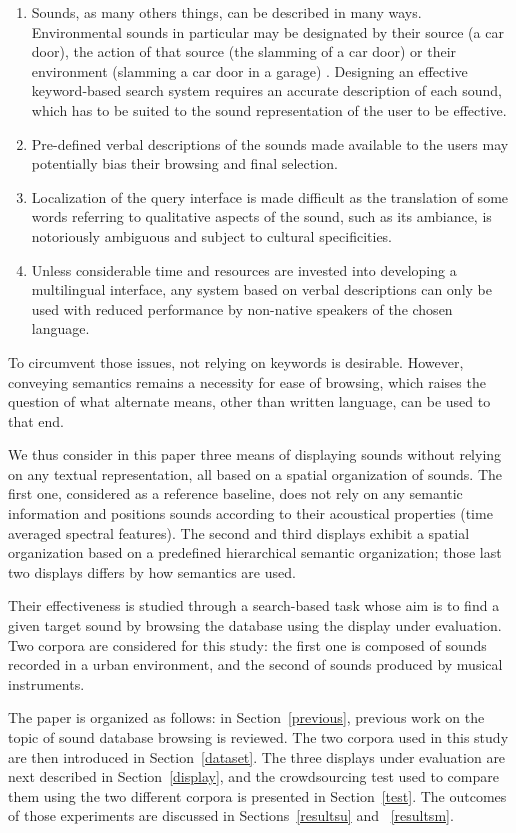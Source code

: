 \documentclass{aes2e}
\begin{document}
\begin{enumerate}
\item Sounds, as many others things, can be described in many ways. Environmental sounds in particular may be designated by their
source (a car door),  the action of that source (the slamming of a car door) or their environment (slamming a car door in a garage) \cite{houix2012lexical, niessen2010categories, brown2011towards}. Designing an effective keyword-based search system requires an accurate description of each sound, which has to be suited to the sound representation of the user to be effective.
\item Pre-defined verbal descriptions of the sounds made available to the users may potentially bias their browsing and final selection.
\item Localization of the query interface is made difficult as the translation of some words referring to qualitative aspects of the sound, such as its ambiance, is notoriously ambiguous and subject to cultural specificities.
\item Unless considerable time and resources are invested into developing a multilingual interface, any system based on verbal descriptions can only be used with reduced performance by non-native speakers of the chosen language.
\end{enumerate}
To circumvent those issues, not relying on keywords is desirable. However, conveying semantics remains a necessity for ease of browsing, which raises the question of what alternate means, other than written language, can be used to that end.

We thus consider in this paper three means of displaying sounds without relying on any textual representation, all based on a spatial organization of sounds. The first one, considered as a reference baseline, does not rely on any semantic information and positions sounds according to their acoustical properties (time averaged spectral features). The second and third displays exhibit a spatial organization based  on a predefined hierarchical semantic organization; those last two displays differs by how semantics are used.

Their effectiveness is studied through a search-based task whose aim is to find a given target sound by browsing the database using the display under evaluation. Two corpora are considered for this study: the first one is composed of sounds recorded in a urban environment, and the second of sounds produced by musical instruments.

The paper is organized as follows: in Section~\ref{previous}, previous work on the topic of sound database browsing is reviewed. The two corpora used in this study are then introduced in Section~\ref{dataset}. The three displays under evaluation are next described in Section~\ref{display}, and the crowdsourcing test used to compare them using the two different corpora is presented in Section~\ref{test}. The outcomes of those experiments are discussed in Sections~\ref{resultsu} and ~\ref{resultsm}.
\end{document}
